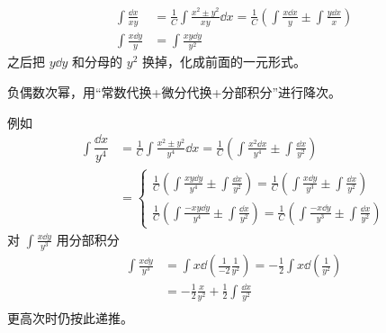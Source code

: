 \begin{theorem}[混合微元型]
\vspace{-15pt}
\begin{align*}
\int \frac{\dd x}{xy}&=\frac{1}{C}\int\frac{x^2\pm y^2}{xy}\dd x=\frac1{C}\left(\int\frac{x\dd x}{y}\pm \int\frac{y\dd x}{x}\right)\\
\int\frac{x\dd y}{y}&=\int\frac{xy\dd y}{y^2}
\end{align*}
之后把 $y\dd y$ 和分母的 $y^2$ 换掉，化成前面的一元形式。
\end{theorem}

\begin{theorem}[负偶次幂型]
负偶数次幂，用“常数代换+微分代换+分部积分”进行降次。
\end{theorem}
例如
\begin{align*}
\int\dfrac{\dd x}{y^4}&=\frac{1}{C}\int\frac{x^2\pm y^2}{y^4}\dd x=\frac{1}{C}\left(\int\frac{x^2\dd x}{y^4}\pm\int\frac{\dd x}{y^2}\right)\\
&=\begin{cases}\frac{1}{C}\left(\int\frac{xy\dd y}{y^4}\pm\int\frac{\dd x}{y^2}\right)=\frac{1}{C}\left(\int\frac{x\dd y}{y^3}\pm\int\frac{\dd x}{y^2}\right)\\\frac{1}{C}\left(\int\frac{-xy\dd y}{y^4}\pm\int\frac{\dd x}{y^2}\right)=\frac{1}{C}\left(\int\frac{-x\dd y}{y^3}\pm\int\frac{\dd x}{y^2}\right)\end{cases}
\end{align*}
对 $\displaystyle\int\frac{x\dd y}{y^3}$ 用分部积分
\begin{align*}
    \int\frac{x\dd y}{y^3}&=\int x\dd\left(\frac1{-2}\frac{1}{y^2}\right)=-\frac12\int x\dd\left(\frac{1}{y^2}\right)\\
    &=-\frac12\frac{x}{y^2}+\frac12\int\frac{\dd x}{y^2}\\
\end{align*}
更高次时仍按此递推。

